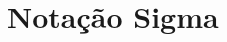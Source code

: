 
\section{Notação Sigma}






\begin{frame}
\frametitle{ }
\begin{small}

\noindent 


\end{small}
\end{frame}



